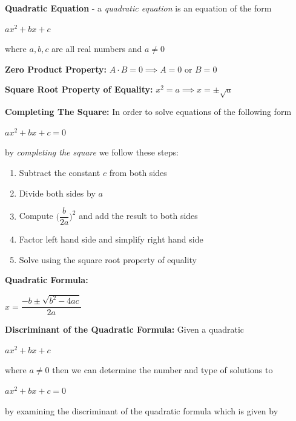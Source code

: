 \documentclass[12pt]{article}
\begin{document}
\textbf{Quadratic Equation} - a \textit{quadratic equation} is an equation of the form
\newline

\centerline{$ax^{2} + bx  + c$}

\hspace{4.2cm} where $a,b,c$ are all real numbers and $a \neq 0$

\textbf{Zero Product Property:} $A \cdot B = 0 \implies A = 0$ or $B = 0$

\textbf{Square Root Property of Equality:} $x^{2} = a \implies x = \pm \sqrt{a}$ 
\newline

\textbf{Completing The Square:} In order to solve equations of the following form
\newline

\centerline{$ax^{2} + bx + c = 0$}

\hspace{5cm} by \textit{completing the square} we follow these steps:
\newline

\begin{enumerate}
\item Subtract the constant $c$ from both sides
\item Divide both sides by $a$
\item Compute $\Big(\dfrac{b}{2a}\Big)^2$ and add the result to both sides
\item Factor left hand side and simplify right hand side
\item Solve using the square root property of equality 
\end{enumerate}

\vspace{1cm}

\textbf{Quadratic Formula:} 

\centerline{$x = \dfrac{-b \pm \sqrt{b^{2} - 4ac}}{2a}$}

\vspace{1cm}

\textbf{Discriminant of the Quadratic Formula:} Given a quadratic
\newline

\centerline{$ax^{2} + bx + c$}

where $a \neq 0$ then we can determine the number and type of solutions to 
\newline

\centerline{$ax^{2} + bx + c = 0$}

by examining the discriminant of the quadratic formula which is given by 
\newline
\end{document}
